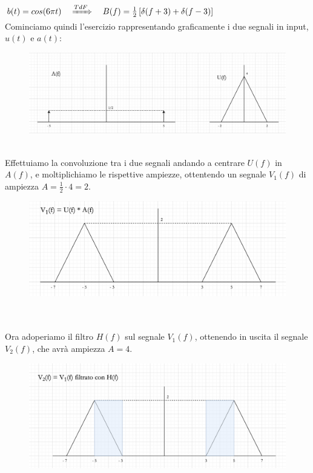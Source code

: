 \documentclass[12pt,a4paper]{article}
\begin{document}
	$b(t) = cos(6\pi t)\quad\xRightarrow[]{TdF}\quad B(f) = \frac{1}{2}\left[\delta(f+3) + \delta(f-3)\right]$\vspace{5px}\\Cominciamo quindi l'esercizio rappresentando graficamente i due segnali in input, $u(t)$ e $a(t)$:
	\begin{figure}[h!]
		\centering
		\includegraphics[scale=0.5]{./images/fourier32.png}
	\end{figure}
	\\Effettuiamo la convoluzione tra i due segnali andando a centrare $U(f)$ in $A(f)$, e moltiplichiamo le rispettive ampiezze, ottentendo un segnale $V_1(f)$ di ampiezza $A = \frac{1}{2} \cdot 4 = 2$.
	\begin{figure}[h!]
		\centering
		\includegraphics[scale=0.5]{./images/fourier33.png}
	\end{figure}
	\\ \\Ora adoperiamo il filtro $H(f)$ sul segnale $V_1(f)$, ottenendo in uscita il segnale $V_2(f)$, che avrà ampiezza $A = 4$.
	\begin{figure}[h!]
		\centering
		\includegraphics[scale=0.4]{./images/fourier34.png}
	\end{figure}
\end{document}
